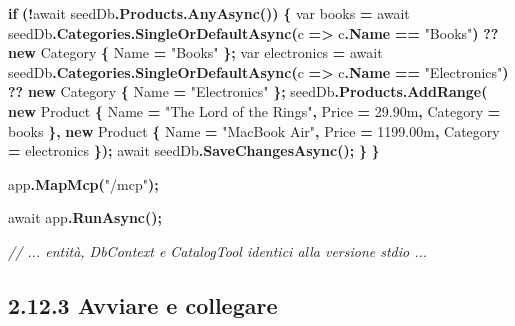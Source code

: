 \documentclass[
  italian,
  10pt,
]{book}
\newenvironment{Shaded}{\begin{snugshade}}{\end{snugshade}}
\newcommand{\CommentTok}[1]{\textcolor[rgb]{0.56,0.35,0.01}{\textit{#1}}}
\newcommand{\DataTypeTok}[1]{\textcolor[rgb]{0.13,0.29,0.53}{#1}}
\newcommand{\FloatTok}[1]{\textcolor[rgb]{0.00,0.00,0.81}{#1}}
\newcommand{\FunctionTok}[1]{\textcolor[rgb]{0.13,0.29,0.53}{\textbf{#1}}}
\newcommand{\KeywordTok}[1]{\textcolor[rgb]{0.13,0.29,0.53}{\textbf{#1}}}
\newcommand{\NormalTok}[1]{#1}
\newcommand{\OperatorTok}[1]{\textcolor[rgb]{0.81,0.36,0.00}{\textbf{#1}}}
\newcommand{\StringTok}[1]{\textcolor[rgb]{0.31,0.60,0.02}{#1}}
\begin{document}
\begin{Shaded}
\begin{Highlighting}[]
    \KeywordTok{if} \OperatorTok{(!}\NormalTok{await seedDb}\OperatorTok{.}\FunctionTok{Products}\OperatorTok{.}\FunctionTok{AnyAsync}\OperatorTok{())}
    \OperatorTok{\{}
        \DataTypeTok{var}\NormalTok{ books }\OperatorTok{=}\NormalTok{ await seedDb}\OperatorTok{.}\FunctionTok{Categories}\OperatorTok{.}\FunctionTok{SingleOrDefaultAsync}\OperatorTok{(}\NormalTok{c }\OperatorTok{=\textgreater{}}\NormalTok{ c}\OperatorTok{.}\FunctionTok{Name} \OperatorTok{==} \StringTok{"Books"}\OperatorTok{)}
            \OperatorTok{??} \KeywordTok{new}\NormalTok{ Category }\OperatorTok{\{}\NormalTok{ Name }\OperatorTok{=} \StringTok{"Books"} \OperatorTok{\};}
        \DataTypeTok{var}\NormalTok{ electronics }\OperatorTok{=}\NormalTok{ await seedDb}\OperatorTok{.}\FunctionTok{Categories}\OperatorTok{.}\FunctionTok{SingleOrDefaultAsync}\OperatorTok{(}\NormalTok{c }\OperatorTok{=\textgreater{}}\NormalTok{ c}\OperatorTok{.}\FunctionTok{Name} \OperatorTok{==} \StringTok{"Electronics"}\OperatorTok{)}
            \OperatorTok{??} \KeywordTok{new}\NormalTok{ Category }\OperatorTok{\{}\NormalTok{ Name }\OperatorTok{=} \StringTok{"Electronics"} \OperatorTok{\};}
\NormalTok{        seedDb}\OperatorTok{.}\FunctionTok{Products}\OperatorTok{.}\FunctionTok{AddRange}\OperatorTok{(}
            \KeywordTok{new}\NormalTok{ Product }\OperatorTok{\{}\NormalTok{ Name }\OperatorTok{=} \StringTok{"The Lord of the Rings"}\OperatorTok{,}\NormalTok{ Price }\OperatorTok{=} \FloatTok{29.90m}\OperatorTok{,}\NormalTok{ Category }\OperatorTok{=}\NormalTok{ books }\OperatorTok{\},}
            \KeywordTok{new}\NormalTok{ Product }\OperatorTok{\{}\NormalTok{ Name }\OperatorTok{=} \StringTok{"MacBook Air"}\OperatorTok{,}\NormalTok{ Price }\OperatorTok{=} \FloatTok{1199.00m}\OperatorTok{,}\NormalTok{ Category }\OperatorTok{=}\NormalTok{ electronics }\OperatorTok{\});}
\NormalTok{        await seedDb}\OperatorTok{.}\FunctionTok{SaveChangesAsync}\OperatorTok{();}
    \OperatorTok{\}}
\OperatorTok{\}}

\NormalTok{app}\OperatorTok{.}\FunctionTok{MapMcp}\OperatorTok{(}\StringTok{"/mcp"}\OperatorTok{);}

\NormalTok{await app}\OperatorTok{.}\FunctionTok{RunAsync}\OperatorTok{();}

\CommentTok{// ... entità, DbContext e CatalogTool identici alla versione stdio ...}
\end{Highlighting}
\end{Shaded}

\subsection{2.12.3 Avviare e collegare}\label{avviare-e-collegare}
\end{document}
